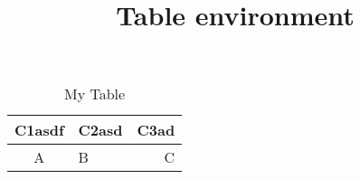\documentclass{article}
\title{Table environment}
\begin{document}
\maketitle

\begin{table}
\centering
\caption{My Table}
\begin{tabular}{c|lr}
C1asdf & C2asd & C3ad \\
\hline
A & B & C
\end{tabular}
\end{table}
\bigskip
\end{document}
